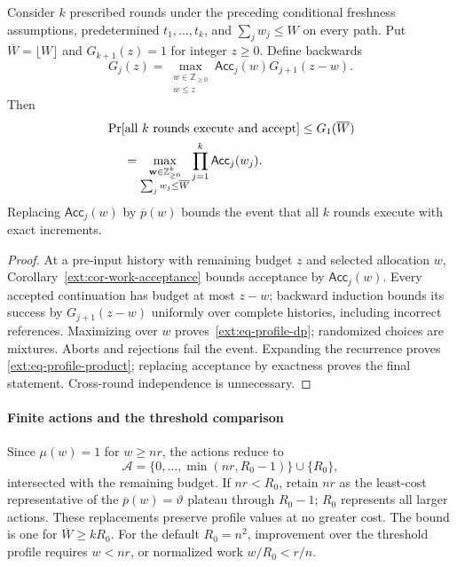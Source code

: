 \begin{theorem}
\label{ext:thm-profile-dp}
Consider $k$ prescribed rounds under the preceding conditional freshness
assumptions, predetermined $t_1,\ldots,t_k$, and $\sum_jw_j\le W$ on every
path. Put $\overline W=\lfloor W\rfloor$ and $G_{k+1}(z)=1$ for integer
$z\ge0$. Define backwards
\begin{equation}
G_j(z)=\max_{\substack{w\in\mathbb Z_{\ge0}\\w\le z}}
       \mathsf{Acc}_j(w)G_{j+1}(z-w).
\label{ext:eq-profile-dp}
\end{equation}
Then
\begin{equation}
\begin{aligned}
&\Pr[\text{all $k$ rounds execute and accept}]\le G_1(\overline W)\\
&\hspace{5mm}=
 \max_{\substack{\mathbf w\in\mathbb Z_{\ge0}^{k}\\
                  \sum_jw_j\le\overline W}}
       \prod_{j=1}^{k}\mathsf{Acc}_j(w_j).
\end{aligned}
\label{ext:eq-profile-product}
\end{equation}
Replacing $\mathsf{Acc}_j(w)$ by $\overline p(w)$ bounds the event that
all $k$ rounds execute with exact increments.
\end{theorem}

\begin{proof}
At a pre-input history with remaining budget $z$ and selected allocation
$w$, Corollary~\ref{ext:cor-work-acceptance} bounds acceptance by
$\mathsf{Acc}_j(w)$. Every accepted continuation has budget at most $z-w$;
backward induction bounds its success by $G_{j+1}(z-w)$ uniformly over
complete histories, including incorrect references. Maximizing over $w$
proves~\eqref{ext:eq-profile-dp}; randomized choices are mixtures.
Aborts and rejections fail the event. Expanding the recurrence proves
\eqref{ext:eq-profile-product}; replacing acceptance by exactness proves
the final statement. Cross-round independence is unnecessary.
\end{proof}

\paragraph{Finite actions and the threshold comparison}
Since $\mu(w)=1$ for $w\ge nr$, the actions reduce to
\begin{equation}
\mathcal A=\{0,\ldots,\min(nr,R_0-1)\}\cup\{R_0\},
\label{ext:eq-dp-actions}
\end{equation}
intersected with the remaining budget. If $nr<R_0$, retain $nr$ as the
least-cost representative of the $\overline p(w)=\vartheta$ plateau
through $R_0-1$; $R_0$ represents all larger actions. These replacements
preserve profile values at no greater cost. The bound is one for
$\overline W\ge kR_0$.
For the default $R_0=n^2$, improvement over the threshold profile
requires $w<nr$, or normalized work $w/R_0<r/n$.

